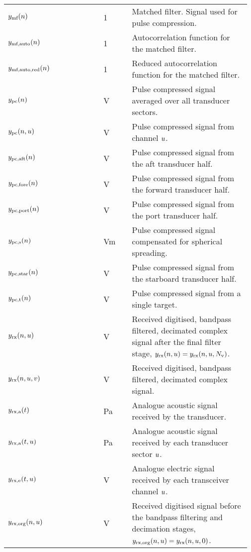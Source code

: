 \documentclass[12pt,a4paper]{article}
\renewcommand{\code}[1]{\texttt{\detokenize{#1}}}
\begin{document}
\begin{longtable}{p{0.15\linewidth} p{0.20\linewidth} p{0.12\linewidth} p{0.5\linewidth} }
$y_{\textrm{mf}}(n)$ & & 1 & Matched filter. Signal used for pulse compression.\\
$y_{\textrm{mf,auto}}(n)$ & & 1 & Autocorrelation function for the matched filter.\\
$y_{\textrm{mf,auto,red}}(n)$ & \code{y_mf_auto_red_n} & 1 & Reduced autocorrelation function for the matched filter.\\

$y_{\textrm{pc}}(n)$ & & V & Pulse compressed signal averaged over all transducer sectors.\\
$y_{\textrm{pc}}(n, u) $ & & V & Pulse compressed signal from channel $u$.\\
$y_{\textrm{pc,aft}}(n)$ & & V & Pulse compressed signal from the aft transducer half.\\
$y_{\textrm{pc,fore}}(n)$ & & V & Pulse compressed signal from the forward transducer half.\\
$y_{\textrm{pc,port}}(n)$ & & V & Pulse compressed signal from the port transducer half.\\
$y_{\textrm{pc,s}}(n)$ & & Vm & Pulse compressed signal compensated for spherical spreading.\\
$y_{\textrm{pc,star}}(n)$ & & V & Pulse compressed signal from the starboard transducer half.\\
$y_{\textrm{pc,t}}(n)$ & & V & Pulse compressed signal from a single target.\\

$y_{\textrm{rx}}(n,u)$ & & V & Received digitised, bandpass filtered, decimated complex signal after the final filter stage, $y_{\textrm{rx}}(n,u) = y_{\textrm{rx}}(n,u,N_{\textrm{v}})$.\\
$y_{\textrm{rx}}(n,u,v)$ & & V & Received digitised, bandpass filtered, decimated complex signal.\\
$y_{\textrm{rx,a}}(t)$ & & Pa & Analogue acoustic signal received by the transducer.\\
$y_{\textrm{rx,a}}(t,u)$ & & Pa & Analogue acoustic signal received by each transducer sector $u$.\\
$y_{\textrm{rx,e}}(t,u)$ & & V & Analogue electric signal received by each transceiver channel $u$.\\

$y_{\textrm{rx,org}}(n,u)$ & & V & Received digitised signal before the bandpass filtering and decimation stages, $y_{\textrm{rx,org}}(n,u) = y_{\textrm{rx}}(n,u,0)$.\\


\end{longtable}
\end{document}
